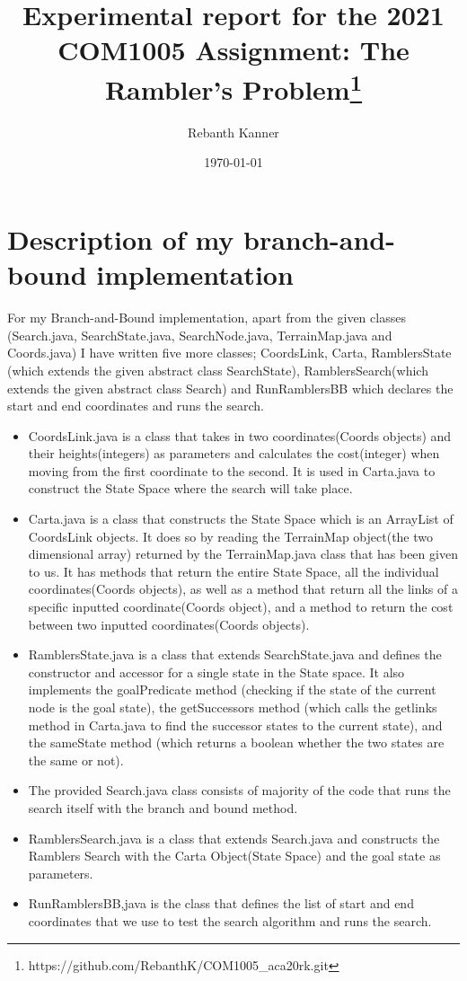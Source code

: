 \documentclass[11pt,oneside]{article}
\title{Experimental report for the 2021 COM1005 Assignment: The Rambler's Problem\footnote{https://github.com/RebanthK/COM1005_aca20rk.git}}
\author{Rebanth Kanner}
\date{\today}
\begin{document}
\maketitle

\section{Description of my branch-and-bound implementation}
For my Branch-and-Bound implementation, apart from the given classes (Search.java, SearchState.java, SearchNode.java, TerrainMap.java and Coords.java) I have written five more classes; CoordsLink, Carta, RamblersState (which extends the given abstract class SearchState), RamblersSearch(which extends the given abstract class Search) and RunRamblersBB which declares the start and end coordinates and runs the search.

\begin{itemize}
    \item CoordsLink.java is a class that takes in two coordinates(Coords objects) and their heights(integers) as parameters and calculates the cost(integer) when moving from the first coordinate to the second. It is used in Carta.java to construct the State Space where the search will take place.
    \item Carta.java is a class that constructs the State Space which is an ArrayList of CoordsLink objects. It does so by reading the TerrainMap object(the two dimensional array) returned by the TerrainMap.java class that has been given to us. It has methods that return the entire State Space, all the individual coordinates(Coords objects), as well as a method that return all the links of a specific inputted coordinate(Coords object), and a method to return the cost between two inputted coordinates(Coords objects).
    \item RamblersState.java is a class that extends SearchState.java and defines the constructor and accessor for a single state in the State space. It also implements the goalPredicate method (checking if the state of the current node is the goal state), the getSuccessors method (which calls the getlinks method in Carta.java to find the successor states to the current state), and the sameState method (which returns a boolean whether the two states are the same or not).
    \item The provided Search.java class consists of majority of the code that runs the search itself with the branch and bound method.
    \item RamblersSearch.java is a class that extends Search.java and constructs the Ramblers Search with the Carta Object(State Space) and the goal state as parameters.
    \item RunRamblersBB,java is the class that defines the list of start and end coordinates that we use to test the search algorithm and runs the search.
\end{itemize}
\end{document}
